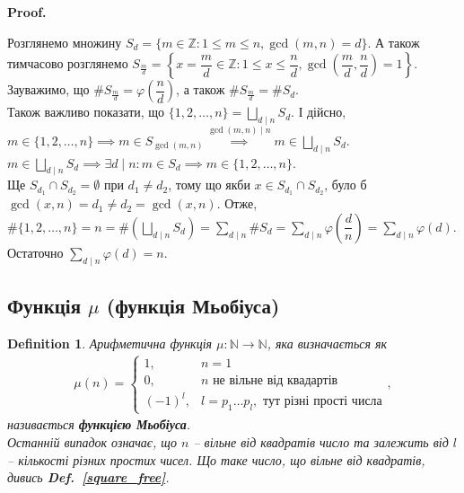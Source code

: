 \documentclass[a4paper, 14pt]{extarticle}
\makeatletter
\theoremstyle{theoremdd}
\theoremstyle{theoremdd}
\newtheorem{definition}[theorem]{Definition}
\theoremstyle{theoremdd}
\theoremstyle{theoremdd}
\theoremstyle{theoremdd}
\theoremstyle{theoremdd}
\theoremstyle{theoremdd}
\theoremstyle{theoremdd}
\def\qed{$\blacksquare$}
\renewenvironment{proof}[1][Proof.\\]{\par
\pushQED{\hfill \qed}%
\normalfont \topsep6\p@\@plus6\p@\relax
\trivlist
\item\relax
{\bfseries
#1\@addpunct{.}}\hspace\labelsep\ignorespaces
}{%
\popQED\endtrivlist\@endpefalse
}
\newcommand\defref[1]{\textbf{Def.~\ref{#1}}}
\makeatother
\begin{document}
\begin{proof}
Розглянемо множину $S_d = \{m \in \mathbb{Z}: 1 \leq m \leq n, \gcd(m,n) = d\}$. А також тимчасово розглянемо $S_{\frac{m}{d}} = \left\{ x = \dfrac{m}{d} \in \mathbb{Z}: 1 \leq x \leq \dfrac{n}{d}, \gcd\left(\dfrac{m}{d},\dfrac{n}{d}\right) = 1\right\}$.\\
Зауважимо, що $\# S_{\frac{m}{d}} = \varphi\left( \dfrac{n}{d} \right)$, а також $\# S_{\frac{m}{d}} = \#S_d$.\\
Також важливо показати, що $\{1,2,\dots,n\} = \displaystyle\bigsqcup_{d \mid n} S_d$. І дійсно,\\
$\displaystyle m \in \{1,2,\dots,n\} \implies m \in S_{\gcd(m,n)} \overset{\gcd(m,n) \mid n}{\implies} m \in \bigsqcup_{d \mid n} S_d$.\\
$m \in \displaystyle\bigsqcup_{d \mid n} S_d \implies \exists d \mid n: m \in S_d \implies m \in \{1,2,\dots,n\}$.\\
Ще $S_{d_1} \cap S_{d_2} = \emptyset$ при $d_1 \neq d_2$, тому що якби $x \in S_{d_1} \cap S_{d_2}$, було б $\gcd(x,n)=d_1 \neq d_2 = \gcd(x,n)$. Отже, \\
$\displaystyle \# \{1,2,\dots,n\} = n = \#\left( \bigsqcup_{d \mid n} S_d \right) = \sum_{d \mid n} \# S_d = \sum_{d \mid n} \varphi\left( \dfrac{d}{n} \right) = \sum_{d \mid n} \varphi(d)$.\\
Остаточно $\displaystyle\sum_{d \mid n} \varphi(d) = n$.
\end{proof}

\subsection{Функція $\mu$ (функція Мьобіуса)}

\begin{definition}
Арифметична функція $\mu \colon \mathbb{N} \to \mathbb{N}$, яка визначається як
\begin{align*}
\mu(n) = \begin{cases} 1,& n = 1 \\ 0, & n \text{ не вільне від квадартів} \\ (-1)^l, & l = p_1 \dots p_l, \text{ тут різні прості числа} \end{cases},
\end{align*}
називається \textbf{функцією Мьобіуса}.\\
Останній випадок означає, що $n$ -- вільне від квадратів число та залежить від $l$ -- кількості різних простих чисел. Що таке число, що вільне від квадратів, дивись \defref{square_free}.
\end{definition}
\end{document}
